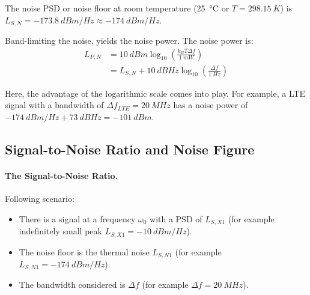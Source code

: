 \begin{refsection}
\begin{fact}
	The noise \ac{PSD} or noise floor at room temperature (\SI{25}{\degreeCelsius} or $T = \SI{298.15}{K}$) is $L_{S,N} = \SI{-173.8}{dBm/Hz} \approx \SI{-174}{dBm/Hz}$.
\end{fact}

Band-limiting the noise, yields the noise power. The noise power is:
\begin{equation}
	\begin{split}
		L_{P,N} &= \SI{10}{dBm} \log_{10} \left(\frac{k_B T \Delta f}{\SI{1}{mW}}\right) \\
		 &= L_{S,N} + \SI{10}{dBHz} \log_{10} \left(\frac{\Delta f}{\SI{1}{Hz}}\right)
	\end{split}
\end{equation}

Here, the advantage of the logarithmic scale comes into play. For example, a \ac{LTE} signal with a bandwidth of $\Delta f_{LTE} = \SI{20}{MHz}$ has a noise power of $\SI{-174}{dBm/Hz} + \SI{73}{dBHz} = \SI{-101}{dBm}$.

\subsection{Signal-to-Noise Ratio and Noise Figure}

\paragraph {The Signal-to-Noise Ratio.}

Following scenario:
\begin{itemize}
	\item There is a signal at a frequency $\omega_0$ with a \ac{PSD} of $L_{S,X1}$ (for example indefinitely small peak $L_{S,X1} = \SI{-10}{dBm/Hz}$).
	\item The noise floor is the thermal noise $L_{S,N1}$ (for example $L_{S,N1} = \SI{-174}{dBm/Hz}$).
	\item The bandwidth considered is $\Delta f$ (for example $\Delta f = \SI{20}{MHz}$).
\end{itemize}

\begin{figure}[H]
	\centering
\end{figure}
\end{refsection}
